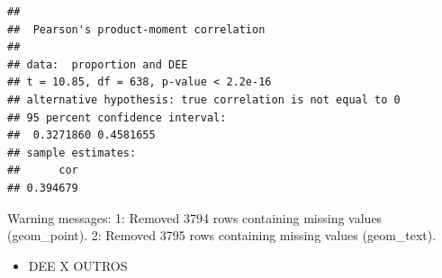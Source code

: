 \documentclass[]{article}
\newenvironment{Shaded}{\begin{snugshade}}{\end{snugshade}}
\newcommand{\FunctionTok}[1]{\textcolor[rgb]{0.00,0.00,0.00}{#1}}
\newcommand{\AttributeTok}[1]{\textcolor[rgb]{0.77,0.63,0.00}{#1}}
\providecommand{\tightlist}{%
  \setlength{\itemsep}{0pt}\setlength{\parskip}{0pt}}
\begin{document}
\begin{verbatim}
## 
##  Pearson's product-moment correlation
## 
## data:  proportion and DEE
## t = 10.85, df = 638, p-value < 2.2e-16
## alternative hypothesis: true correlation is not equal to 0
## 95 percent confidence interval:
##  0.3271860 0.4581655
## sample estimates:
##      cor 
## 0.394679
\end{verbatim}

\begin{Shaded}
\begin{Highlighting}[]
\FunctionTok{Warning messages:}
\FunctionTok{1:}\AttributeTok{ Removed 3794 rows containing missing values (geom_point). }
\FunctionTok{2:}\AttributeTok{ Removed 3795 rows containing missing values (geom_text).}
\end{Highlighting}
\end{Shaded}

\begin{itemize}
\tightlist
\item
  DEE X OUTROS
\end{itemize}
\end{document}
